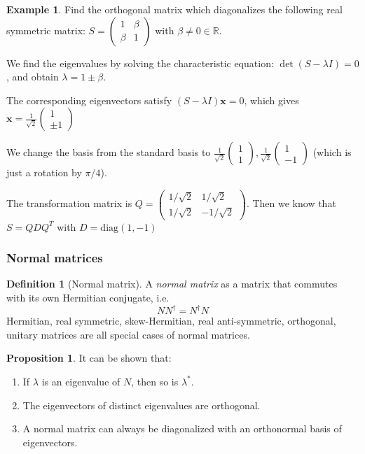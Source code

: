 \documentclass[a4paper]{article}
\theoremstyle{definition}
\newtheorem*{prop}{Proposition}
\newtheorem*{defi}{Definition}
\newtheorem*{eg}{Example}
\newcommand{\mb}[1]{\mathbf{#1}}
\newcommand{\R}{\mathbb{R}}
\begin{document}
\begin{eg}
  Find the orthogonal matrix which diagonalizes the following real symmetric matrix: $S = 
  \begin{pmatrix}
    1 & \beta\\
    \beta & 1
  \end{pmatrix}$ with $\beta \not= 0 \in \R$.

  We find the eigenvalues by solving the characteristic equation: $\det(S - \lambda I) = 0$, and obtain $\lambda = 1\pm \beta$.

  The corresponding eigenvectors satisfy $(S - \lambda I)\mb{x} = 0$, which gives $\displaystyle \mb{x} = \frac{1}{\sqrt{2}}
  \begin{pmatrix}
    1\\
    \pm1
  \end{pmatrix}$

  We change the basis from the standard basis to $
  \displaystyle
  \frac{1}{\sqrt{2}}\begin{pmatrix}
    1\\1
  \end{pmatrix},
  \frac{1}{\sqrt{2}}
  \begin{pmatrix}
    1\\-1
  \end{pmatrix}$ (which is just a rotation by $\pi/4$).

  The transformation matrix is $
  Q = \begin{pmatrix}
    1/\sqrt{2} & 1/\sqrt{2}\\
    1/\sqrt{2} & -1/\sqrt{2}
  \end{pmatrix}$. Then we know that $S = QDQ^T$ with $D = \mathrm{diag}(1, -1)$
\end{eg}
\subsubsection{Normal matrices}
\begin{defi}[Normal matrix]
  A \emph{normal matrix} as a matrix that commutes with its own Hermitian conjugate, i.e.
  \[
  NN^\dagger = N^\dagger N
  \]
  Hermitian, real symmetric, skew-Hermitian, real anti-symmetric, orthogonal, unitary matrices are all special cases of normal matrices.  
\end{defi}

\begin{prop}
  It can be shown that:
  \begin{enumerate}
  \item If $\lambda$ is an eigenvalue of $N$, then so is $\lambda^*$.
  \item The eigenvectors of distinct eigenvalues are orthogonal.
  \item A normal matrix can always be diagonalized with an orthonormal basis of eigenvectors.
  \end{enumerate}
\end{prop}
\end{document}
